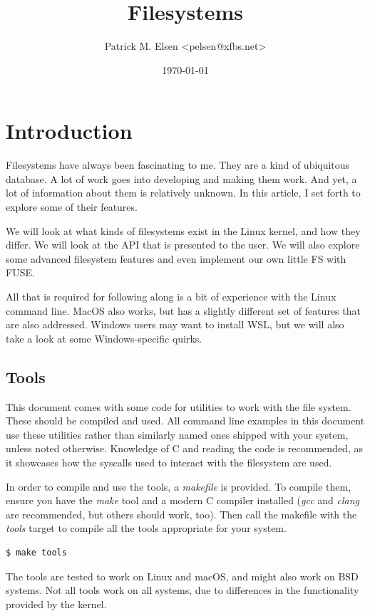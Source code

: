 \documentclass[a4paper]{article}
\title{Filesystems}
\author{Patrick M. Elsen <pelsen@xfbs.net>}
\date{\today}
\begin{document}
\maketitle

\tableofcontents

\section{Introduction}

Filesystems have always been fascinating to me. They are a kind of ubiquitous database. A lot of work goes into developing and making them work. And yet, a lot of information about them is relatively unknown. In this article, I set forth to explore some of their features.

We will look at what kinds of filesystems exist in the Linux kernel, and how they differ. We will look at the API that is presented to the user. We will also explore some advanced filesystem features and even implement our own little FS with FUSE.

All that is required for following along is a bit of experience with the Linux command line. MacOS also works, but has a slightly different set of features that are also addressed. Windows users may want to install WSL, but we will also take a look at some Windows-specific quirks.

\subsection{Tools}

This document comes with some code for utilities to work with the file system. These should be compiled and used. All command line examples in this document use these utilities rather than similarly named ones shipped with your system, unless noted otherwise. Knowledge of C and reading the code is recommended, as it showcases how the syscalls used to interact with the filesystem are used.

In order to compile and use the tools, a \emph{makefile} is provided. To compile them, ensure you have the \emph{make} tool and a modern C compiler installed (\emph{gcc} and \emph{clang} are recommended, but others should work, too). Then call the makefile with the \emph{tools} target to compile all the tools appropriate for your system.

\begin{verbatim}
$ make tools
\end{verbatim}
The tools are tested to work on Linux and macOS, and might also work on BSD systems. Not all tools work on all systems, due to differences in the functionality provided by the kernel.
\end{document}
